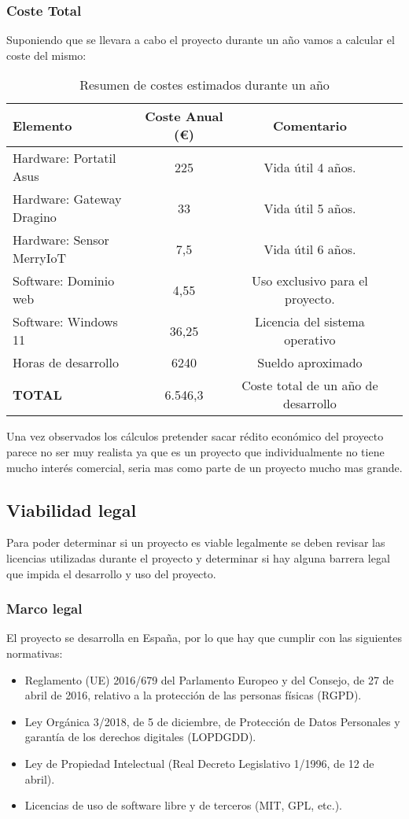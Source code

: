\subsubsection{Coste Total}
Suponiendo que se llevara a cabo el proyecto durante un año vamos a calcular el coste del mismo:
\begin{table}[H]
\centering
\begin{tabular}{|l|c|c|p{5cm}|}
\hline
\textbf{Elemento} & \textbf{Coste Anual (€)} & \textbf{Comentario} \\
\hline
Hardware: Portatil Asus & 225  & Vida útil 4 años. \\
\hline
Hardware: Gateway Dragino & 33  & Vida útil 5 años. \\
\hline
Hardware: Sensor MerryIoT & 7,5  & Vida útil 6 años. \\
\hline
Software: Dominio web & 4,55 & Uso exclusivo para el proyecto. \\
\hline
Software: Windows 11 & 36,25  & Licencia del sistema operativo \\
\hline
Horas de desarrollo & 6240  & Sueldo aproximado \\
\hline
\textbf{TOTAL} & 6.546,3  & Coste total de un año de desarrollo \\
\hline
\end{tabular}
\caption{Resumen de costes estimados durante un año}
\label{tab:viabilidad-economica}
\end{table}
Una vez observados los cálculos pretender sacar rédito económico del proyecto parece no ser muy realista ya que es un proyecto que individualmente no tiene mucho interés comercial, seria mas como parte de un proyecto mucho mas grande. 

\subsection{Viabilidad legal}
Para poder determinar si un proyecto es viable legalmente se deben revisar las licencias utilizadas durante el proyecto y determinar si hay alguna barrera legal que impida el desarrollo y uso del proyecto.

\subsubsection{Marco legal}

El proyecto se desarrolla en España, por lo que hay que cumplir con las siguientes normativas:

\begin{itemize}
    \item Reglamento (UE) 2016/679 del Parlamento Europeo y del Consejo, de 27 de abril de 2016, relativo a la protección de las personas físicas (RGPD).
    \item Ley Orgánica 3/2018, de 5 de diciembre, de Protección de Datos Personales y garantía de los derechos digitales (LOPDGDD).
    \item Ley de Propiedad Intelectual (Real Decreto Legislativo 1/1996, de 12 de abril).
    \item Licencias de uso de software libre y de terceros (MIT, GPL, etc.).
\end{itemize}

